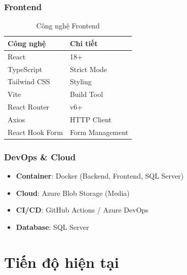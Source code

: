 \documentclass[12pt,a4paper]{report}
\begin{document}
\subsection{Frontend}
\begin{table}[h]
    \centering
    \begin{tabular}{|l|l|}
        \hline
        \rowcolor{lightblue}
        \textbf{Công nghệ} & \textbf{Chi tiết} \\
        \hline
        React & 18+ \\
        TypeScript & Strict Mode \\
        Tailwind CSS & Styling \\
        Vite & Build Tool \\
        React Router & v6+ \\
        Axios & HTTP Client \\
        React Hook Form & Form Management \\
        \hline
    \end{tabular}
    \caption{Công nghệ Frontend}
\end{table}

\subsection{DevOps \& Cloud}
\begin{itemize}
    \item \textbf{Container}: Docker (Backend, Frontend, SQL Server)
    \item \textbf{Cloud}: Azure Blob Storage (Media)
    \item \textbf{CI/CD}: GitHub Actions / Azure DevOps
    \item \textbf{Database}: SQL Server
\end{itemize}

\newpage

\chapter{Tiến độ hiện tại}
\end{document}
